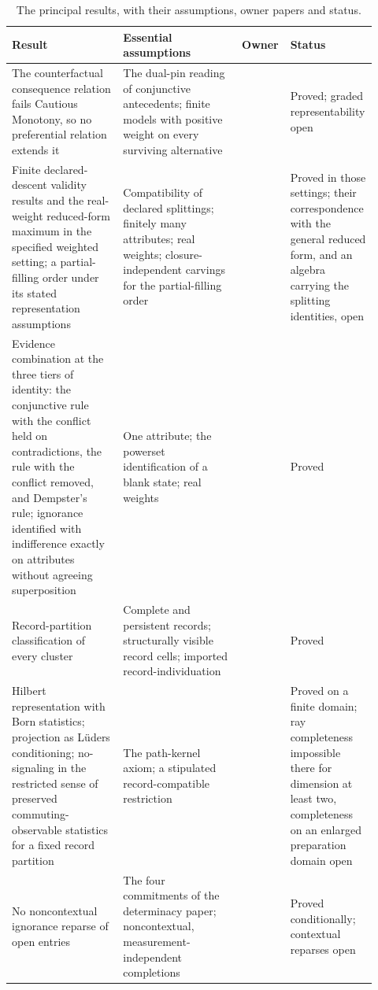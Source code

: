 \documentclass[11pt]{article}
\theoremstyle{definition}
\begin{document}
\begin{table}[htbp]
\centering
\small
\caption{The principal results, with their assumptions, owner papers and status.}
\label{tab:results}
\begin{tabular}{@{}p{0.3\linewidth}p{0.32\linewidth}p{0.12\linewidth}p{0.18\linewidth}@{}}
\toprule
Result & Essential assumptions & Owner & Status \\
\midrule
The counterfactual consequence relation fails Cautious Monotony, so no preferential relation extends it & The dual-pin reading of conjunctive antecedents; finite models with positive weight on every surviving alternative & \cite{AethusSemantics} & Proved; graded representability open \\
Finite declared-descent validity results and the real-weight reduced-form maximum in the specified weighted setting; a partial-filling order under its stated representation assumptions & Compatibility of declared splittings; finitely many attributes; real weights; closure-independent carvings for the partial-filling order & \cite{AethusTree} & Proved in those settings; their correspondence with the general reduced form, and an algebra carrying the splitting identities, open \\
Evidence combination at the three tiers of identity: the conjunctive rule with the conflict held on contradictions, the rule with the conflict removed, and Dempster's rule; ignorance identified with indifference exactly on attributes without agreeing superposition & One attribute; the powerset identification of a blank state; real weights & \cite{AethusEvidence} & Proved \\
Record-partition classification of every cluster & Complete and persistent records; structurally visible record cells; imported record-individuation & \cite{AethusQuant} & Proved \\
Hilbert representation with Born statistics; projection as L\"uders conditioning; no-signaling in the restricted sense of preserved commuting-observable statistics for a fixed record partition & The path-kernel axiom; a stipulated record-compatible restriction & \cite{AethusQuant} & Proved on a finite domain; ray completeness impossible there for dimension at least two, completeness on an enlarged preparation domain open \\
No noncontextual ignorance reparse of open entries & The four commitments of the determinacy paper; noncontextual, measurement-independent completions & \cite{AethusRealist} & Proved conditionally; contextual reparses open \\

\end{tabular}
\end{table}
\end{document}
